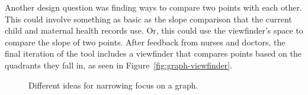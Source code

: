 \documentclass{sig-alternate}
\begin{document}
Another design question was finding ways to compare two points with each other. This could involve something as basic as the slope comparison that the current child and maternal health records use. Or, this could use the viewfinder's space to compare the slope of two points. After feedback from nurses and doctors, the final iteration of the tool includes a viewfinder that compares points based on the quadrants they fall in, as seen in Figure~\ref{fig:graph-viewfinder}.

\begin{figure}%
    \centering
    \qquad
    \caption{Different ideas for narrowing focus on a graph.}%
    \label{fig:graph-focus}%
\end{figure}
\end{document}
